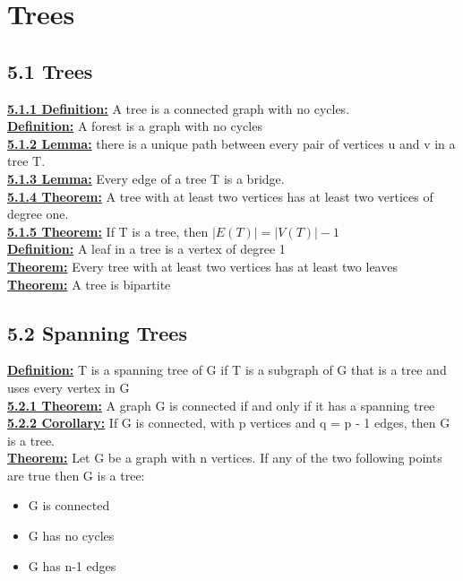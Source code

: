 \documentclass[12pt]{article}
\newcommand{\myt}[1]{\textbf{\underline{#1}}}
\begin{document}
	\section{Trees}
	\subsection*{5.1 Trees}
	\myt{5.1.1 Definition:} A tree is a connected graph with no cycles.\\
	\myt{Definition:} A forest is a graph with no cycles\\
	
	\myt{5.1.2 Lemma:} there is a unique path between every pair of vertices u and v in a tree T.\\
	
	\myt{5.1.3 Lemma:} Every edge of a tree T is a bridge.\\
	
	\myt{5.1.4 Theorem:} A tree with at least two vertices has at least two vertices of degree one.\\
	
	\myt{5.1.5 Theorem:} If T is a tree, then $|E(T)| = |V(T)| - 1$\\
	
	\myt{Definition:} A leaf in a tree is a vertex of degree 1\\
	\myt{Theorem:} Every tree with at least two vertices has at least two leaves\\
	
	\myt{Theorem:} A tree is bipartite\\
	
	\subsection*{5.2 Spanning Trees}
	\myt{Definition:} T is a spanning tree of G if T is a subgraph of G that is a tree and uses every vertex in G\\
	
	\myt{5.2.1 Theorem:} A graph G is connected if and only if it has a spanning tree\\
	
	\myt{5.2.2 Corollary:} If G is connected, with p vertices and q = p - 1 edges, then G is a tree.\\
	
	\myt{Theorem:} Let G be a graph with n vertices. If any of the two following points are true then G is a tree:\\
	\begin{itemize}
		\item G is connected
		\item G has no cycles
		\item G has n-1 edges
	\end{itemize}
	
\end{document}
